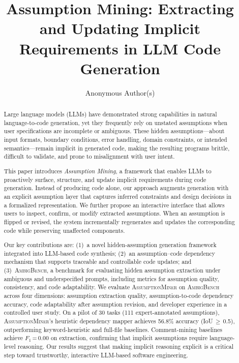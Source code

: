 \documentclass[sigconf,review,anonymous]{acmart}
\newcommand{\sysname}{\textsc{AssumptionMiner}\xspace}
\newcommand{\benchname}{\textsc{AmbigBench}\xspace}
\begin{document}
\title{Assumption Mining: Extracting and Updating Implicit Requirements in LLM Code Generation}

\author{Anonymous Author(s)}

\begin{abstract}
Large language models (LLMs) have demonstrated strong capabilities in natural
language-to-code generation, yet they frequently rely on unstated assumptions when user
specifications are incomplete or ambiguous.
These hidden assumptions---about input formats, boundary conditions, error handling,
domain constraints, or intended semantics---remain implicit in generated code, making the
resulting programs brittle, difficult to validate, and prone to misalignment with user intent.

This paper introduces \emph{Assumption Mining}, a framework that enables LLMs to
proactively surface, structure, and update implicit requirements during code generation.
Instead of producing code alone, our approach augments generation with an explicit
assumption layer that captures inferred constraints and design decisions in a formalized
representation.
We further propose an interactive interface that allows users to inspect, confirm, or
modify extracted assumptions.
When an assumption is flipped or revised, the system incrementally regenerates and
updates the corresponding code while preserving unaffected components.

Our key contributions are:
(1)~a novel hidden-assumption generation framework integrated into LLM-based code
synthesis;
(2)~an assumption--code dependency mechanism that supports traceable and controllable
code updates; and
(3)~\benchname, a benchmark for evaluating hidden assumption extraction under
ambiguous and underspecified prompts, including metrics for assumption quality,
consistency, and code adaptability.
We evaluate \sysname on \benchname across four dimensions: assumption extraction
quality, assumption-to-code dependency accuracy, code adaptability after assumption
revision, and developer experience in a controlled user study.
On a pilot of 30 tasks (111 expert-annotated assumptions), \sysname's heuristic
dependency mapper achieves 56.8\% accuracy (IoU\,$\geq$\,0.5), outperforming
keyword-heuristic and full-file baselines.  Comment-mining baselines achieve
$F_1$\,=\,0.00 on extraction, confirming that implicit assumptions require
language-level reasoning.
Our results suggest that making implicit reasoning explicit is a critical step toward
trustworthy, interactive LLM-based software engineering.
\end{abstract}
\end{document}
